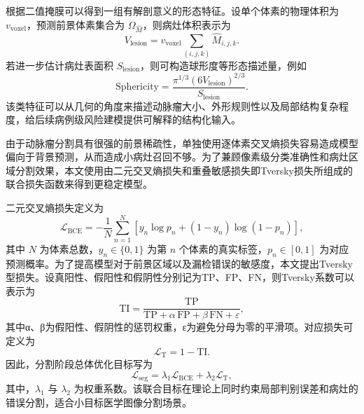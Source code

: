 根据二值掩膜可以得到一组有解剖意义的形态特征。设单个体素的物理体积为 $v_{\mathrm{voxel}}$，预测前景体素集合为 $\Omega_{\hat{M}}$，则病灶体积表示为
\begin{equation}
V_{\mathrm{lesion}}=v_{\mathrm{voxel}}\sum_{(i,j,k)}\hat{M}_{i,j,k}.
\label{eq:lesion-volume}
\end{equation}
若进一步估计病灶表面积 $S_{\mathrm{lesion}}$，则可构造球形度等形态描述量，例如
\begin{equation}
\mathrm{Sphericity}=\frac{\pi^{1/3}(6V_{\mathrm{lesion}})^{2/3}}{S_{\mathrm{lesion}}}.
\label{eq:sphericity}
\end{equation}
该类特征可以从几何的角度来描述动脉瘤大小、外形规则性以及局部结构复杂程度，给后续病例级风险建模提供可解释的结构化输入。

由于动脉瘤分割具有很强的前景稀疏性，单独使用逐体素交叉熵损失容易造成模型偏向于背景预测，从而造成小病灶召回不够。为了兼顾像素级分类准确性和病灶区域分割效果，本文使用由二元交叉熵损失和重叠敏感损失即Tversky损失所组成的联合损失函数来得到更稳定模型。

二元交叉熵损失定义为
\begin{equation}
\mathcal{L}_{\mathrm{BCE}} = -\frac{1}{N}\sum_{n=1}^{N}\left[y_n\log p_n + (1-y_n)\log(1-p_n)\right],
\label{eq:seg-bce}
\end{equation}
其中 $N$ 为体素总数，$y_n\in\{0,1\}$ 为第 $n$ 个体素的真实标签，$p_n\in[0,1]$ 为对应预测概率。为了提高模型对于前景区域以及漏检错误的敏感度，本文提出Tversky型损失。设真阳性、假阳性和假阴性分别记为TP、FP、FN，则Tversky系数可以表示为
\begin{equation}
\mathrm{TI} = \frac{\mathrm{TP}}{\mathrm{TP}+\alpha\,\mathrm{FP}+\beta\,\mathrm{FN}+\varepsilon},
\label{eq:tversky-index}
\end{equation}
其中α、β为假阳性、假阴性的惩罚权重，ε为避免分母为零的平滑项。对应损失可定义为
\begin{equation}
\mathcal{L}_{\mathrm{T}} = 1-\mathrm{TI}.
\label{eq:tversky-loss}
\end{equation}
因此，分割阶段总体优化目标写为
\begin{equation}
\mathcal{L}_{\mathrm{seg}} = \lambda_1\mathcal{L}_{\mathrm{BCE}} + \lambda_2\mathcal{L}_{\mathrm{T}},
\label{eq:seg-loss}
\end{equation}
其中，$\lambda_1$ 与 $\lambda_2$ 为权重系数。该联合目标在理论上同时约束局部判别误差和病灶的错误分割，适合小目标医学图像分割场景。

